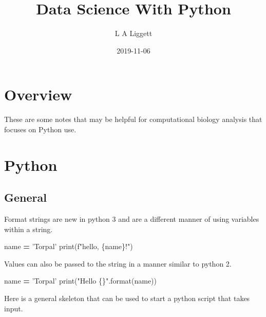 \documentclass[]{book}
\title{Data Science With Python}
\author{L A Liggett}
\date{2019-11-06}
\newenvironment{Shaded}{\begin{snugshade}}{\end{snugshade}}
\newcommand{\BuiltInTok}[1]{#1}
\newcommand{\NormalTok}[1]{#1}
\newcommand{\OperatorTok}[1]{\textcolor[rgb]{0.81,0.36,0.00}{\textbf{#1}}}
\newcommand{\SpecialCharTok}[1]{\textcolor[rgb]{0.00,0.00,0.00}{#1}}
\newcommand{\SpecialStringTok}[1]{\textcolor[rgb]{0.31,0.60,0.02}{#1}}
\newcommand{\StringTok}[1]{\textcolor[rgb]{0.31,0.60,0.02}{#1}}
\begin{document}
\maketitle

{
\setcounter{tocdepth}{1}
\tableofcontents
}
\hypertarget{overview}{%
\chapter{Overview}\label{overview}}

These are some notes that may be helpful for computational biology analysis that focuses on Python use.

\hypertarget{python}{%
\chapter{Python}\label{python}}

\hypertarget{general}{%
\section{General}\label{general}}

Format strings are new in python 3 and are a different manner of using variables within a string.

\begin{Shaded}
\begin{Highlighting}[]
\NormalTok{name }\OperatorTok{=} \StringTok{'Torpal'}
\BuiltInTok{print}\NormalTok{(}\SpecialStringTok{f"hello, }\SpecialCharTok{\{}\NormalTok{name}\SpecialCharTok{\}}\SpecialStringTok{!"}\NormalTok{)}
\end{Highlighting}
\end{Shaded}

Values can also be passed to the string in a manner similar to python 2.

\begin{Shaded}
\begin{Highlighting}[]
\NormalTok{name }\OperatorTok{=} \StringTok{'Torpal'}
\BuiltInTok{print}\NormalTok{(}\StringTok{"Hello }\SpecialCharTok{\{\}}\StringTok{"}\NormalTok{.}\BuiltInTok{format}\NormalTok{(name))}
\end{Highlighting}
\end{Shaded}

Here is a general skeleton that can be used to start a python script that takes input.
\end{document}
